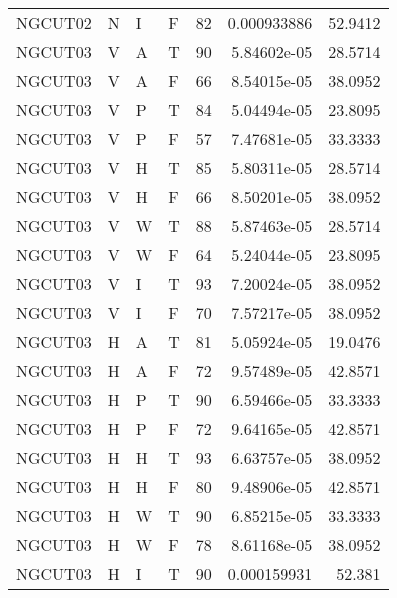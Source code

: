 \begin{longtable}{llllrrr}
    NGCUT02  & N         & I         & F          & 82         & 0.000933886 & 52.9412  \\
    NGCUT03  & V         & A         & T          & 90         & 5.84602e-05 & 28.5714  \\
    NGCUT03  & V         & A         & F          & 66         & 8.54015e-05 & 38.0952  \\
    NGCUT03  & V         & P         & T          & 84         & 5.04494e-05 & 23.8095  \\
    NGCUT03  & V         & P         & F          & 57         & 7.47681e-05 & 33.3333  \\
    NGCUT03  & V         & H         & T          & 85         & 5.80311e-05 & 28.5714  \\
    NGCUT03  & V         & H         & F          & 66         & 8.50201e-05 & 38.0952  \\
    NGCUT03  & V         & W         & T          & 88         & 5.87463e-05 & 28.5714  \\
    NGCUT03  & V         & W         & F          & 64         & 5.24044e-05 & 23.8095  \\
    NGCUT03  & V         & I         & T          & 93         & 7.20024e-05 & 38.0952  \\
    NGCUT03  & V         & I         & F          & 70         & 7.57217e-05 & 38.0952  \\
    NGCUT03  & H         & A         & T          & 81         & 5.05924e-05 & 19.0476  \\
    NGCUT03  & H         & A         & F          & 72         & 9.57489e-05 & 42.8571  \\
    NGCUT03  & H         & P         & T          & 90         & 6.59466e-05 & 33.3333  \\
    NGCUT03  & H         & P         & F          & 72         & 9.64165e-05 & 42.8571  \\
    NGCUT03  & H         & H         & T          & 93         & 6.63757e-05 & 38.0952  \\
    NGCUT03  & H         & H         & F          & 80         & 9.48906e-05 & 42.8571  \\
    NGCUT03  & H         & W         & T          & 90         & 6.85215e-05 & 33.3333  \\
    NGCUT03  & H         & W         & F          & 78         & 8.61168e-05 & 38.0952  \\
    NGCUT03  & H         & I         & T          & 90         & 0.000159931 & 52.381   \\

\end{longtable}
